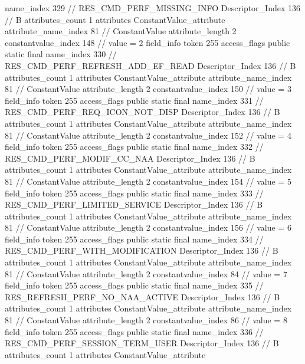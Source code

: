 {{{{{				name_index	329		// RES_CMD_PERF_MISSING_INFO
				Descriptor_Index	136		// B
				attributes_count	1
				attributes {
				ConstantValue_attribute {
					attribute_name_index	81		// ConstantValue
					attribute_length	2
					constantvalue_index	148		// value = 2
				}
				}
			}
			field_info {
				token	255
				access_flags	public static final
				name_index	330		// RES_CMD_PERF_REFRESH_ADD_EF_READ
				Descriptor_Index	136		// B
				attributes_count	1
				attributes {
				ConstantValue_attribute {
					attribute_name_index	81		// ConstantValue
					attribute_length	2
					constantvalue_index	150		// value = 3
				}
				}
			}
			field_info {
				token	255
				access_flags	public static final
				name_index	331		// RES_CMD_PERF_REQ_ICON_NOT_DISP
				Descriptor_Index	136		// B
				attributes_count	1
				attributes {
				ConstantValue_attribute {
					attribute_name_index	81		// ConstantValue
					attribute_length	2
					constantvalue_index	152		// value = 4
				}
				}
			}
			field_info {
				token	255
				access_flags	public static final
				name_index	332		// RES_CMD_PERF_MODIF_CC_NAA
				Descriptor_Index	136		// B
				attributes_count	1
				attributes {
				ConstantValue_attribute {
					attribute_name_index	81		// ConstantValue
					attribute_length	2
					constantvalue_index	154		// value = 5
				}
				}
			}
			field_info {
				token	255
				access_flags	public static final
				name_index	333		// RES_CMD_PERF_LIMITED_SERVICE
				Descriptor_Index	136		// B
				attributes_count	1
				attributes {
				ConstantValue_attribute {
					attribute_name_index	81		// ConstantValue
					attribute_length	2
					constantvalue_index	156		// value = 6
				}
				}
			}
			field_info {
				token	255
				access_flags	public static final
				name_index	334		// RES_CMD_PERF_WITH_MODIFICATION
				Descriptor_Index	136		// B
				attributes_count	1
				attributes {
				ConstantValue_attribute {
					attribute_name_index	81		// ConstantValue
					attribute_length	2
					constantvalue_index	84		// value = 7
				}
				}
			}
			field_info {
				token	255
				access_flags	public static final
				name_index	335		// RES_REFRESH_PERF_NO_NAA_ACTIVE
				Descriptor_Index	136		// B
				attributes_count	1
				attributes {
				ConstantValue_attribute {
					attribute_name_index	81		// ConstantValue
					attribute_length	2
					constantvalue_index	86		// value = 8
				}
				}
			}
			field_info {
				token	255
				access_flags	public static final
				name_index	336		// RES_CMD_PERF_SESSION_TERM_USER
				Descriptor_Index	136		// B
				attributes_count	1
				attributes {
				ConstantValue_attribute {
}}}}}}}
